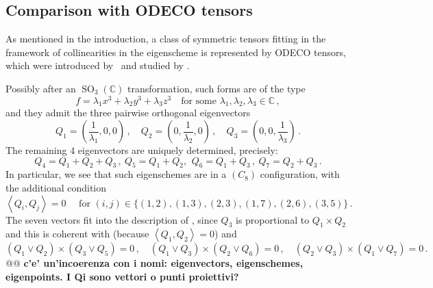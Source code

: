 \documentclass{amsart}
\theoremstyle{plain}
\theoremstyle{definition}
\newcommand{\C}{\mathbb{C}}
\newcommand{\SO}{\operatorname{SO}}
\newcommand{\scl}[2]{\left\langle {#1}, {#2} \right\rangle}
\begin{document}
\subsection*{Comparison with ODECO tensors}
As mentioned in the introduction, a class of
symmetric tensors fitting in the framework of collinearities in the eigenscheme is represented by ODECO tensors, which were introduced by~\cite{Rob} and studied by \cite{BDHE, Koiran2021, Biaggi2022}.

Possibly after an $\SO_3(\C)$ transformation, such forms are of the type
%
\[
  f = \lambda_1 x^3 +\lambda_2 y^3 + \lambda_3 z^3
  \quad \text{for some } \lambda_1, \lambda_2, \lambda_3 \in \C \,,
\]
%
and they admit the three pairwise orthogonal eigenvectors
%
\[
  Q_1 = (\frac{1}{\lambda_1},0,0) \,, \quad
  Q_2 = (0,\frac{1}{\lambda_2},0) \,, \quad
  Q_3 = (0,0,\frac{1}{\lambda_3}) \,.
\]
%
The remaining $4$ eigenvectors are uniquely determined, precisely:
%
\[
  Q_4 = Q_1+Q_2+Q_3\,, \ Q_5 = Q_1+Q_2,\, \ Q_6 = Q_1+Q_3 \,, \ Q_7 = Q_2+Q_3\,.
\]
%
In particular, we see that such eigenschemes are in a $(C_8)$ configuration, with the additional condition
%
\[
  \left\langle Q_i,Q_j \right\rangle = 0
  \quad \text{ for } (i, j) \in \{(1, 2), (1, 3), (2, 3), (1, 7), (2, 6), (3, 5)\} \,.
\]
%
The seven vectors fit into the description of , since $Q_3 $ is proportional to $Q_1 \times Q_2$ and this is coherent with 
(because $\scl{Q_1}{Q_2} = 0$)
and
%
\[
  (Q_1 \vee Q_2) \times (Q_3 \vee Q_5) = 0 \,, \quad
  (Q_1 \vee Q_3) \times (Q_2 \vee Q_6) = 0 \,, \quad
  (Q_2 \vee Q_3) \times (Q_1 \vee Q_7) = 0 \,.
\]
%
@@ \textbf{c'e' un'incoerenza con i nomi: eigenvectors, eigenschemes,  eigenpoints. I Qi sono vettori o punti proiettivi?}
%


\end{document}
